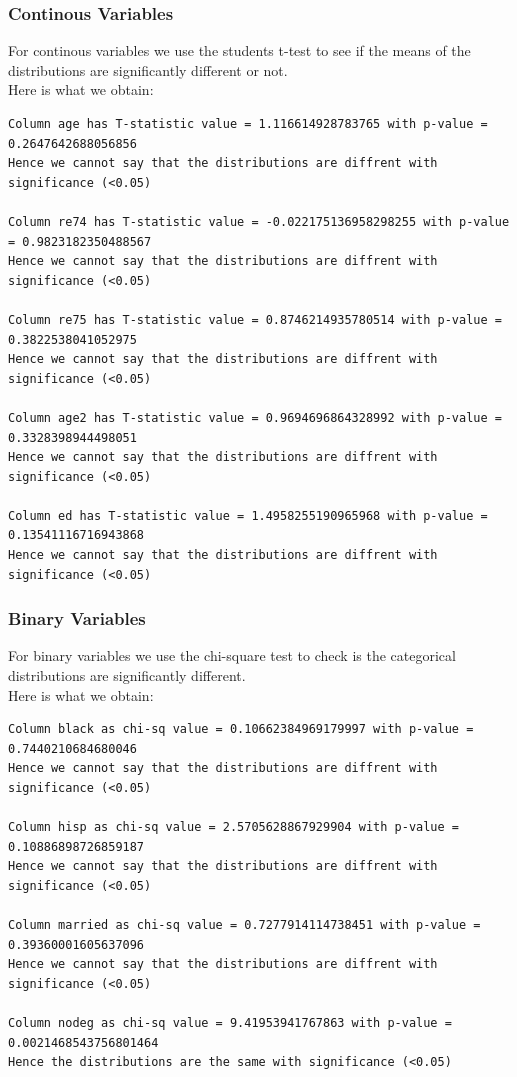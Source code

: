 \documentclass{article}
\begin{document}
\subsubsection{Continous Variables}
For continous variables we use the students t-test to see if the means 
of the distributions are significantly different or not.\\
Here is what we obtain:\\
\begin{verbatim}
Column age has T-statistic value = 1.116614928783765 with p-value = 0.2647642688056856
Hence we cannot say that the distributions are diffrent with significance (<0.05)

Column re74 has T-statistic value = -0.022175136958298255 with p-value = 0.9823182350488567
Hence we cannot say that the distributions are diffrent with significance (<0.05)

Column re75 has T-statistic value = 0.8746214935780514 with p-value = 0.3822538041052975
Hence we cannot say that the distributions are diffrent with significance (<0.05)

Column age2 has T-statistic value = 0.9694696864328992 with p-value = 0.3328398944498051
Hence we cannot say that the distributions are diffrent with significance (<0.05)

Column ed has T-statistic value = 1.4958255190965968 with p-value = 0.13541116716943868
Hence we cannot say that the distributions are diffrent with significance (<0.05)
\end{verbatim} 

\subsubsection{Binary Variables}
For binary variables we use the chi-square test to check is the categorical
distributions are significantly different.\\
Here is what we obtain:\\
\begin{verbatim}
Column black as chi-sq value = 0.10662384969179997 with p-value = 0.7440210684680046
Hence we cannot say that the distributions are diffrent with significance (<0.05)
    
Column hisp as chi-sq value = 2.5705628867929904 with p-value = 0.10886898726859187
Hence we cannot say that the distributions are diffrent with significance (<0.05)
    
Column married as chi-sq value = 0.7277914114738451 with p-value = 0.39360001605637096
Hence we cannot say that the distributions are diffrent with significance (<0.05)
    
Column nodeg as chi-sq value = 9.41953941767863 with p-value = 0.0021468543756801464
Hence the distributions are the same with significance (<0.05)
\end{verbatim}
\clearpage
\end{document}
